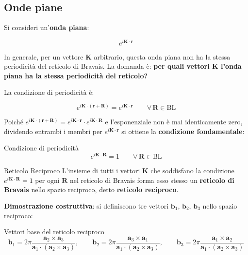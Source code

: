 \subsection{Onde piane}

Si consideri un'\textbf{onda piana}:

$$e^{i\mathbf{K} \cdot \mathbf{r}}$$

In generale, per un vettore $\mathbf{K}$ arbitrario, questa onda piana non ha la stessa periodicità del reticolo di Bravais. La domanda è: \textbf{per quali vettori $\mathbf{K}$ l'onda piana ha la stessa periodicità del reticolo?}

La condizione di periodicità è:

$$e^{i\mathbf{K} \cdot (\mathbf{r} + \mathbf{R})} = e^{i\mathbf{K} \cdot \mathbf{r}} \qquad \forall\, \mathbf{R} \in \text{BL}$$

Poiché $e^{i\mathbf{K} \cdot (\mathbf{r} + \mathbf{R})} = e^{i\mathbf{K} \cdot \mathbf{r}} \cdot e^{i\mathbf{K} \cdot \mathbf{R}}$ e l'esponenziale non è mai identicamente zero, dividendo entrambi i membri per $e^{i\mathbf{K} \cdot \mathbf{r}}$ si ottiene la \textbf{condizione fondamentale}:

\begin{equazione}{Condizione di periodicità}
\begin{equation}
e^{i\mathbf{K} \cdot \mathbf{R}} = 1 \qquad \forall\, \mathbf{R} \in \text{BL}
\end{equation}
\end{equazione}


\begin{definizione}{Reticolo Reciproco}
L'insieme di tutti i vettori $\mathbf{K}$ che soddisfano la condizione $e^{i\mathbf{K}\cdot\mathbf{R}} = 1$ per ogni $\mathbf{R}$ nel reticolo di Bravais forma esso stesso un \textbf{reticolo di Bravais} nello spazio reciproco, detto \textbf{reticolo reciproco}.
\end{definizione}

\textbf{Dimostrazione costruttiva}: si definiscono tre vettori $\mathbf{b}_1$, $\mathbf{b}_2$, $\mathbf{b}_3$ nello spazio reciproco:

\begin{equazione}{Vettori base del reticolo reciproco}
\begin{equation}
\mathbf{b}_1 = 2\pi \frac{\mathbf{a}_2 \times \mathbf{a}_3}{\mathbf{a}_1 \cdot (\mathbf{a}_2 \times \mathbf{a}_3)}, \qquad \mathbf{b}_2 = 2\pi \frac{\mathbf{a}_3 \times \mathbf{a}_1}{\mathbf{a}_1 \cdot (\mathbf{a}_2 \times \mathbf{a}_3)}, \qquad \mathbf{b}_3 = 2\pi \frac{\mathbf{a}_1 \times \mathbf{a}_2}{\mathbf{a}_1 \cdot (\mathbf{a}_2 \times \mathbf{a}_3)}
\end{equation}
\end{equazione}

